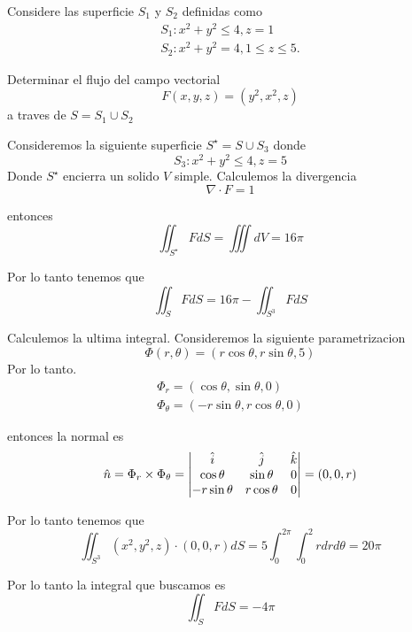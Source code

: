 \message{ !name(MAT024.tex)}\documentclass[../main.tex]{subfiles}
\begin{document}
\begin{problem}
  Considere las superficie $S_{1}$ y $S_{2}$ definidas como
  \begin{gather*}
    S_{1}: x^{2} + y^{2} \leq 4, z = 1\\
    S_{2}: x^{2} + y^{2} = 4, 1 \leq z \leq 5.
  \end{gather*}

  Determinar el flujo del campo vectorial
  \begin{equation*}
    F(x, y, z) = (y^{2}, x^{2}, z)
  \end{equation*}
  a traves de $S = S_{1} \cup S_{2}$
\end{problem}
\begin{solution}
  Consideremos la siguiente superficie $S^{\star} = S \cup S_{3}$ donde
  \begin{equation*}
    S_{3}: x^{2} + y^{2} \leq 4, z = 5
  \end{equation*}
  Donde $S^{\star}$ encierra un solido $V$ simple. Calculemos la divergencia
  \begin{equation*}
    \nabla \cdot F = 1
  \end{equation*}

  entonces
  \begin{equation*}
    \iint_{S^{\star}} F dS = \iiint dV = 16 \pi
  \end{equation*}

  Por lo tanto tenemos que
  \begin{equation*}
    \iint_{S} F dS = 16 \pi - \iint_{S^{3}} F dS
  \end{equation*}

  Calculemos la ultima integral. Consideremos la siguiente parametrizacion
  \begin{equation*}
    \Phi(r, \theta) = (r \cos \theta, r \sin \theta, 5)
  \end{equation*}
  Por lo tanto.
  \begin{gather*}
    \Phi_{r} = (\cos \theta, \sin \theta, 0)\\
    \Phi_{\theta} = (- r \sin \theta, r \cos \theta, 0)
  \end{gather*}

  entonces la normal es
  \begin{equation*}
    \hat{n} = \Phi_{r} \times \Phi_{\theta} = \begin{vmatrix} \hat{i} & \hat{j} & \hat{k}\\ \cos \theta & \sin \theta & 0\\ -r \sin \theta & r \cos \theta & 0\end{vmatrix} = (0, 0, r)
  \end{equation*}

  Por lo tanto tenemos que
  \begin{equation*}
    \iint_{S^{3}} (x^{2}, y^{2}, z) \cdot (0, 0, r) dS = 5 \int_{0}^{2\pi}\int_{0}^{2} r dr d \theta = 20 \pi
  \end{equation*}

  Por lo tanto la integral que buscamos es
  \begin{equation*}
    \iint_{S} F dS = -4 \pi
  \end{equation*}
\end{solution}
\end{document}
